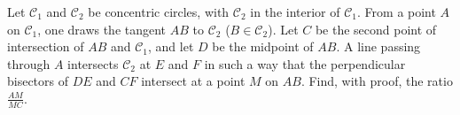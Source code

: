 Let $\mathcal{C}_1$ and $\mathcal{C}_2$ be concentric circles, with $\mathcal{C}_2$ in the interior of $\mathcal{C}_1$. From a point $A$ on $\mathcal{C}_1$, one draws the tangent $AB$ to $\mathcal{C}_2$ ($B\in\mathcal{C}_2$). Let $C$ be the second point of intersection of $AB$ and $\mathcal{C}_1$, and let $D$ be the midpoint of $AB$. A line passing through $A$ intersects $\mathcal{C}_2$ at $E$ and $F$ in such a way that the perpendicular bisectors of $DE$ and $CF$ intersect at a point $M$ on $AB$. Find, with proof, the ratio $\frac{AM}{MC}$.
